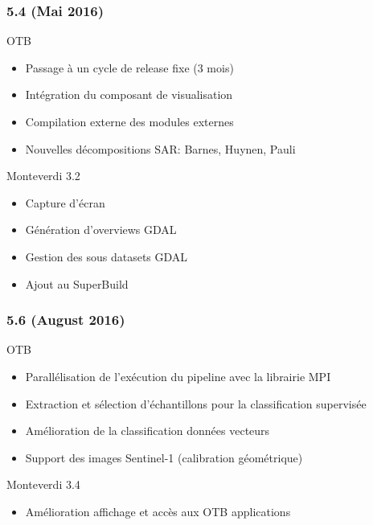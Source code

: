 \documentclass[8pt]{beamer}
\begin{document}
\begin{frame}
\frametitle{5.4 (Mai 2016)}
\begin{block}{OTB}
\begin{itemize}
\item Passage à un cycle de release fixe (3 mois)
\item Intégration du composant de visualisation
\item Compilation externe des modules externes
\item Nouvelles décompositions SAR: Barnes, Huynen, Pauli
\end{itemize}
\end{block}

\begin{block}{Monteverdi 3.2}
\begin{itemize}
\item Capture d'écran
\item Génération d'overviews GDAL
\item Gestion des sous datasets GDAL
\item Ajout au SuperBuild
\end{itemize}
\end{block}
\end{frame}

\begin{frame}
\frametitle{5.6 (August 2016)}
\begin{block}{OTB}
\begin{itemize}
\item Parallélisation de l'exécution du pipeline avec la librairie MPI
\item Extraction et sélection d'échantillons pour la classification supervisée
\item Amélioration de la classification données vecteurs
\item Support des images Sentinel-1 (calibration géométrique)
\end{itemize}
\end{block}

\begin{block}{Monteverdi 3.4}
\begin{itemize}
\item Amélioration affichage et accès aux OTB applications
\end{itemize}
\end{block}
\end{frame}
\end{document}
